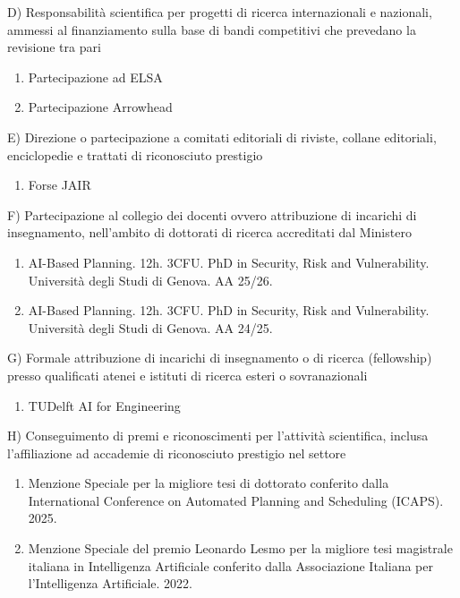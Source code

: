 \documentclass{resume} %
\begin{document}
\begin{rSectionLower}{D) Responsabilità scientifica per progetti di ricerca internazionali e nazionali, ammessi al finanziamento sulla base di bandi competitivi che prevedano la revisione tra pari}
	\begin{enumerate}
		\item Partecipazione ad ELSA
		\item Partecipazione Arrowhead
	\end{enumerate}
\end{rSectionLower}

\begin{rSectionLower}{E) Direzione o partecipazione a comitati editoriali di riviste, collane editoriali, enciclopedie e trattati di riconosciuto prestigio}
	\begin{enumerate}
		\item Forse JAIR
	\end{enumerate}
\end{rSectionLower}

\begin{rSectionLower}{F) Partecipazione al collegio dei docenti ovvero attribuzione di incarichi di insegnamento, nell'ambito di dottorati di ricerca accreditati dal Ministero}
	\begin{enumerate}
		\item AI-Based Planning. 12h. 3CFU. PhD in Security, Risk and Vulnerability. Università degli Studi di Genova. AA 25/26.
		\item AI-Based Planning. 12h. 3CFU. PhD in Security, Risk and Vulnerability. Università degli Studi di Genova. AA 24/25.
	\end{enumerate}
\end{rSectionLower}

\begin{rSectionLower}{G) Formale attribuzione di incarichi di insegnamento o di ricerca (fellowship) presso qualificati atenei e istituti di ricerca esteri o sovranazionali}
	\begin{enumerate}
		\item TUDelft AI for Engineering
	\end{enumerate}
\end{rSectionLower}

\break
\begin{rSectionLower}{H) Conseguimento di premi e riconoscimenti per l'attività scientifica, inclusa l’affiliazione ad accademie di riconosciuto prestigio nel settore}
	\begin{enumerate}
		\item Menzione Speciale per la migliore tesi di dottorato conferito dalla International Conference on Automated Planning and Scheduling (ICAPS). 2025.
		\item Menzione Speciale del premio Leonardo Lesmo per la migliore tesi magistrale italiana in Intelligenza Artificiale conferito dalla Associazione Italiana per l'Intelligenza Artificiale. 2022.
	\end{enumerate}
\end{rSectionLower}
\end{document}
